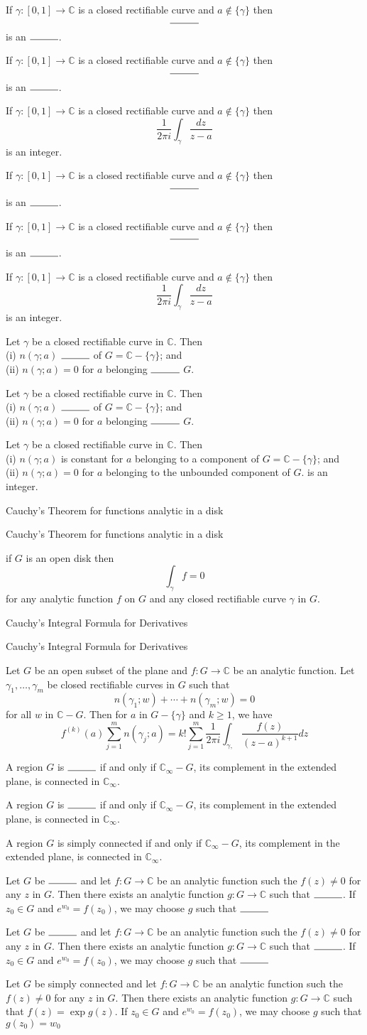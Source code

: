 \documentclass[17pt]{extarticle}
\newcommand{\boxset}[2]{\begin{mdframed}[style=darkQuesion]
#1
\end{mdframed}
\newpage
\begin{mdframed}[style=darkQuesion]
  #1
    \end{mdframed}
\begin{mdframed}[style=darkAnswer]
  #2
    \end{mdframed}
    \newpage
}
\begin{document}
\boxset{ If $\gamma:[0,1] \rightarrow \mathbb{C}$ is a closed rectifiable curve and $a \notin\{\gamma\}$ then \[\rule{1cm}{0.15mm}\] is an $\rule{1cm}{0.15mm}$.}{ If $\gamma:[0,1] \rightarrow \mathbb{C}$ is a closed rectifiable curve and $a \notin\{\gamma\}$ then \[\frac{1}{2 \pi i} \int_{\gamma} \frac{d z}{z-a}\] is an integer.}
\boxset{ If $\gamma:[0,1] \rightarrow \mathbb{C}$ is a closed rectifiable curve and $a \notin\{\gamma\}$ then \[\rule{1cm}{0.15mm}\] is an $\rule{1cm}{0.15mm}$.}{ If $\gamma:[0,1] \rightarrow \mathbb{C}$ is a closed rectifiable curve and $a \notin\{\gamma\}$ then \[\frac{1}{2 \pi i} \int_{\gamma} \frac{d z}{z-a}\] is an integer.}
\boxset{  Let $\gamma$ be a closed rectifiable curve in $\mathbb{C}$. Then\[\ \] (i) $n(\gamma ; a)$ $\rule{1cm}{0.15mm}$ of $G=\mathbb{C}-\{\gamma\}$; and\[\ \] (ii) $n(\gamma ; a)=0$ for $a$ belonging $\rule{1cm}{0.15mm}$ $G$. }
{ Let $\gamma$ be a closed rectifiable curve in $\mathbb{C}$. Then\[\ \] (i) $n(\gamma ; a)$ is constant for $a$ belonging to a component of $G=\mathbb{C}-\{\gamma\}$; and\[\ \] (ii) $n(\gamma ; a)=0$ for $a$ belonging to the unbounded component of $G$. is an integer.}
\boxset{Cauchy's Theorem for functions analytic in a disk }
{if $G$ is an open disk then \[\int_{\gamma} f=0\] for any analytic function $f$ on $G$ and any closed rectifiable curve $\gamma$ in $G$.}
\boxset{Cauchy's Integral Formula for Derivatives }
{Let $G$ be an open subset of the plane and $f: G \rightarrow \mathbb{C}$ be an analytic function. Let $\gamma_{1}, \ldots, \gamma_{m}$ be closed rectifiable curves in $G$ such that \[n\left(\gamma_{1} ; w\right)+\cdots+n\left(\gamma_{m} ; w\right)=0\] for all $w$ in $\mathbb{C}-G$. Then for $a$ in $G-\{\gamma\}$ and $k \geq 1$, we have \[f^{(k)}(a) \sum_{j=1}^{m} n\left(\gamma_{j} ; a\right)=k ! \sum_{j=1}^{m} \frac{1}{2 \pi i} \int_{\gamma,} \frac{f(z)}{(z-a)^{k+1}} d z\]}
\boxset{   A region $G$ is $\rule{1cm}{0.15mm}$ if and only if $\mathbb{C}_{\infty}-G$, its complement in the extended plane, is connected in $\mathbb{C}_{\infty}$.  }
{A region $G$ is simply connected if and only if $\mathbb{C}_{\infty}-G$, its complement in the extended plane, is connected in $\mathbb{C}_{\infty}$.}
\boxset{   Let $G$ be $\rule{1cm}{0.15mm}$ and let $f: G \rightarrow \mathbb{C}$ be an analytic function such the $f(z) \neq 0$ for any $z$ in $G$. Then there exists an analytic function $g: G \rightarrow \mathbb{C}$ such that $\rule{1cm}{0.15mm}$. If $z_{0} \in G$ and $e^{w_{0}}=f\left(z_{0}\right)$, we may choose $g$ such that $\rule{1cm}{0.15mm}$  }
{   Let $G$ be simply connected and let $f: G \rightarrow \mathbb{C}$ be an analytic function such the $f(z) \neq 0$ for any $z$ in $G$. Then there exists an analytic function $g: G \rightarrow \mathbb{C}$ such that $f(z)=\exp g(z)$. If $z_{0} \in G$ and $e^{w_{0}}=f\left(z_{0}\right)$, we may choose $g$ such that $g\left(z_{0}\right)=w_{0}$ }
\end{document}
